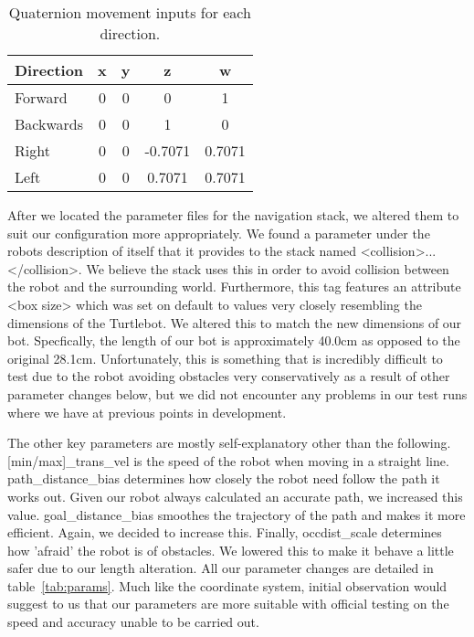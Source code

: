 \documentclass{article}
\begin{document}
\begin{table}[h]
\vskip 3mm
\begin{center}
\begin{small}
\begin{sc}
\begin{tabular}{lcccc}
\hline
\abovespace\belowspace
Direction & x & y & z & w \\
\hline
  Forward & 0 & 0 & 0 & 1\\
  Backwards & 0 & 0 & 1 & 0 \\
  Right & 0 & 0 & -0.7071 & 0.7071 \\
  Left & 0 & 0 & 0.7071 & 0.7071 
\end{tabular}
\end{sc}
\end{small}
\caption{Quaternion movement inputs for each direction.}
\label{tab:quaternions}
\end{center}
\vskip -3mm
\end{table}

After we located the parameter files for the navigation stack, we altered them to suit our configuration more appropriately. We found a parameter under the robots description of itself that it provides to the stack named <collision>...</collision>. We believe the stack uses this in order to avoid collision between the robot and the surrounding world. Furthermore, this tag features an attribute <box size> which was set on default to values very closely resembling the dimensions of the Turtlebot. We altered this to match the new dimensions of our bot. Specfically, the length of our bot is approximately 40.0cm as opposed to the original 28.1cm. Unfortunately, this is something that is incredibly difficult to test due to the robot avoiding obstacles very conservatively as a result of other parameter changes below, but we did not encounter any problems in our test runs where we have at previous points in development.

The other key parameters are mostly self-explanatory other than the following. [min/max]\_trans\_vel is the speed of the robot when moving in a straight line. path\_distance\_bias determines how closely the robot need follow the path it works out. Given our robot always calculated an accurate path, we increased this value. goal\_distance\_bias smoothes the trajectory of the path and makes it more efficient. Again, we decided to increase this. Finally, occdist\_scale determines how 'afraid' the robot is of obstacles. We lowered this to make it behave a little safer due to our length alteration. All our parameter changes are detailed in table~\ref{tab:params}. Much like the coordinate system, initial observation would suggest to us that our parameters are more suitable with official testing on the speed and accuracy unable to be carried out.
\end{document}
